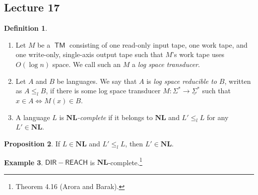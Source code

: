 \documentclass[10pt,letterpaper,cm]{nupset}
\theoremstyle{definition}
\newtheorem{definition}{Definition}[subsection]
\newtheorem{exmp}[definition]{Example}
\theoremstyle{theorem}
\newtheorem{prop}[definition]{Proposition}
\theoremstyle{remark}
\newcommand{\1}{\mathbf{1}}
\newcommand{\0}{\vec 0}
\DeclareMathOperator{\TM}{\mathsf{TM}}
\begin{document}
\subsection{Lecture 17}

\begin{definition} $ $
\begin{enumerate}
\item
Let $M$ be a $\TM$ consisting of one read-only input tape, one work tape, and one write-only, single-axis output tape such that $M$'s work tape uses $O(\log{n})$ space. We call such an $M$ a \textit{log space transducer}.
\item Let $A$ and $B$ be languages. We say that $A$ is \textit{log space reducible to $B$}, written as $A\leq_l B$, if there is some log space transducer $M: \Sigma^{\ast} \to \underline{\Sigma}^{\ast}$ such that $x \in A \iff M(x) \in B$. 
\item A language $L$ is \textit{$\mathbf{NL}$-complete} if it belongs to $\mathbf{NL}$ and $L' \leq_l L$ for any $L' \in \mathbf{NL}$.
\end{enumerate}
\end{definition}

\begin{prop}
If $L \in \mathbf{NL}$ and $L' \leq_l L$, then  $L' \in \mathbf{NL}$.
\end{prop}

\begin{exmp}
$\mathsf{DIR{-}REACH}$ is $\mathbf{NL}$-complete.\footnote{Theorem 4.16 (Arora and Barak).}
\end{exmp}
\end{document}
